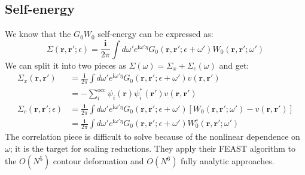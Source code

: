 \subsection{Self-energy}
We know that the $G_0W_0$ self-energy can be expressed as:
\begin{equation}
\Sigma(\mathbf{r}, \mathbf{r}'; \epsilon ) = \frac{\bm{i}}{2\pi} \int d\omega' e^{\bm{i}\omega' \eta} G_0(\mathbf{r}, \mathbf{r}'; \epsilon + \omega') W_0(\mathbf{r}, \mathbf{r}'; \omega')
\end{equation}
We can split it into two pieces as $\Sigma (\omega ) = \Sigma_x + \Sigma_c(\omega)$ and get:
\begin{align}
    \Sigma_x(\mathbf{r}, \mathbf{r}') &= \frac{\bm{i}}{2\pi} \int d\omega' e^{\bm{i}\omega' \eta} G_0(\mathbf{r}, \mathbf{r}'; \epsilon + \omega') v(\mathbf{r}, \mathbf{r}')\\
    &= -\sum_i^{\text{occ}} \psi_i(\mathbf{r}) \psi_i^*(\mathbf{r'}) v(\mathbf{r}, \mathbf{r'})\\
    \Sigma_c(\mathbf{r}, \mathbf{r}'; \epsilon) &= \frac{\bm{i}}{2\pi} \int d\omega' e^{\bm{i}\omega' \eta} G_0(\mathbf{r}, \mathbf{r}'; \epsilon + \omega') [W_0(\mathbf{r}, \mathbf{r}'; \omega') - v(\mathbf{r}, \mathbf{r}')]\\
    &= \frac{\bm{i}}{2\pi} \int d\omega' e^{\bm{i}\omega' \eta} G_0(\mathbf{r}, \mathbf{r}'; \epsilon + \omega') W_0^c(\mathbf{r}, \mathbf{r}'; \omega')
\end{align}
 The correlation piece is difficult to solve because of the nonlinear dependence on $\omega$; it is the target for scaling reductions. They apply their FEAST algorithm to the  $O(N^5)$ contour deformation and $O(N^6)$ fully analytic approaches.
